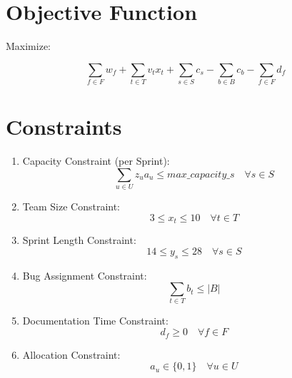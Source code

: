 \documentclass{article}
\begin{document}
\section{Objective Function}

Maximize:

\[
\sum_{f \in F} w_f + \sum_{t \in T} v_t x_t + \sum_{s \in S} c_s - \sum_{b \in B} c_b  - \sum_{f \in F} d_f
\]

\section{Constraints}

\begin{enumerate}
    \item Capacity Constraint (per Sprint):
    \[
    \sum_{u \in U} z_u a_u \leq max\_capacity\_s \quad \forall s \in S
    \]
    \item Team Size Constraint:
    \[
    3 \leq x_t \leq 10 \quad \forall t \in T
    \]
    \item Sprint Length Constraint:
    \[
    14 \leq y_s \leq 28 \quad \forall s \in S
    \]
    \item Bug Assignment Constraint:
    \[
    \sum_{t \in T} b_t \leq |B|
    \]
    \item Documentation Time Constraint:
    \[
    d_f \geq 0 \quad \forall f \in F
    \]
    \item Allocation Constraint:
    \[
    a_u \in \{0, 1\} \quad \forall u \in U
    \]
\end{enumerate}
\end{document}
